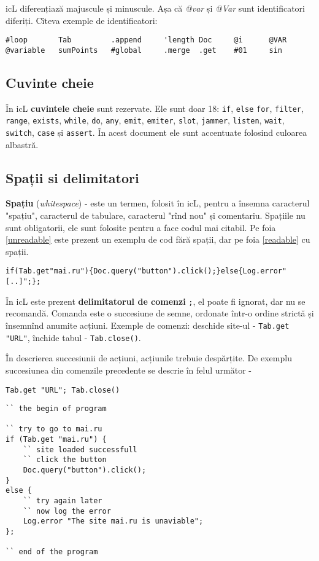 icL diferențiază majuscule și minuscule. Așa că \textit{@var} și \textit{@Var} sunt identificatori diferiți. Cîteva exemple de identificatori:

\begin{lstlisting}[numbers=none]
#loop		Tab	    	.append		'length	Doc 	@i	 	@VAR
@variable	sumPoints	#global		.merge	.get	#01		sin
\end{lstlisting}

\subsection{Cuvinte cheie}

În icL \textbf{cuvintele cheie} sunt rezervate. Ele sunt doar 18: \lstinline|if|, \lstinline|else| \lstinline|for|, \lstinline|filter|, \lstinline|range|, \lstinline|exists|, \lstinline|while|, \lstinline|do|, \lstinline|any|, \lstinline|emit|, \lstinline|emiter|, \lstinline|slot|, \lstinline|jammer|, \lstinline|listen|, \lstinline|wait|, \lstinline|switch|, \lstinline|case| și \lstinline|assert|. În acest document ele sunt accentuate folosind culoarea albastră.

\subsection{Spații si delimitatori}

\textbf{Spațiu} (\textit{whitespace}) - este un termen, folosit în icL, pentru a însemna caracterul "spațiu", caracterul de tabulare, caracterul "rînd nou" și comentariu. Spațiile nu sunt obligatorii, ele sunt folosite pentru a face codul mai citabil. Pe foia \ref{unreadable} este prezent un exemplu de cod fără spații, dar pe foia \ref{readable} cu spații.

\begin{lstlisting}[caption=Cod fără spații,label=unreadable]
if(Tab.get"mai.ru"){Doc.query("button").click();}else{Log.error"[..]";};
\end{lstlisting}

În icL este prezent \textbf{delimitatorul de comenzi} \lstinline|;|, el poate fi ignorat, dar nu se recomandă. Comanda este o succesiune de semne, ordonate într-o ordine strictă și însemnînd anumite acțiuni. Exemple de comenzi: deschide site-ul - \lstinline|Tab.get "URL"|, închide tabul - \lstinline|Tab.close()|.

În descrierea succesiunii de acțiuni, acțiunile trebuie despărțite. De exemplu succesiunea din comenzile precedente se descrie în felul următor -
\begin{lstlisting}[numbers=none]
Tab.get "URL"; Tab.close()
\end{lstlisting}

\begin{lstlisting}[caption=Cod cu spații,label=readable]
`` the begin of program

`` try to go to mai.ru
if (Tab.get "mai.ru") {
	`` site loaded successfull
	`` click the button
	Doc.query("button").click();
}
else {
	`` try again later
	`` now log the error
	Log.error "The site mai.ru is unaviable";
};

`` end of the program
\end{lstlisting}

